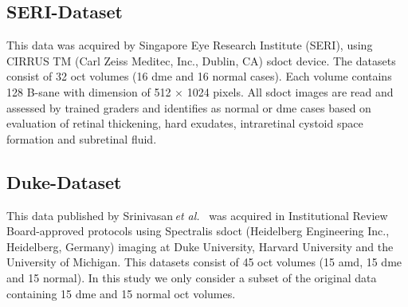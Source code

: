 \subsection{SERI-Dataset}\label{sec:exp:dataset:seri}
This data was acquired by Singapore Eye Research Institute (SERI), using CIRRUS TM (Carl Zeiss Meditec, Inc., Dublin, CA) \ac{sdoct} device. The datasets consist of 32 \ac{oct} volumes (16 \ac{dme} and 16 normal cases). Each volume contains 128 B-sane with  dimension of 512 $\times$ 1024 pixels.  All \ac{sdoct} images are read and assessed by trained graders and identifies as normal or \ac{dme} cases based on evaluation of retinal thickening, hard exudates, intraretinal cystoid space formation and subretinal fluid.

\subsection{Duke-Dataset} \label{sec:exp:dataset:duke}
This data published by Srinivasan\,\emph{et al.}~\cite{Srinivasan2014} was acquired in Institutional Review Board-approved protocols using Spectralis \ac{sdoct} (Heidelberg Engineering Inc., Heidelberg, Germany) imaging at Duke University, Harvard University and the University of Michigan. This datasets consist of 45 \ac{oct} volumes (15 \ac{amd}, 15 \ac{dme} and 15 normal). In this study we only consider a subset of the original data containing 15 \ac{dme} and 15 normal \ac{oct} volumes.


